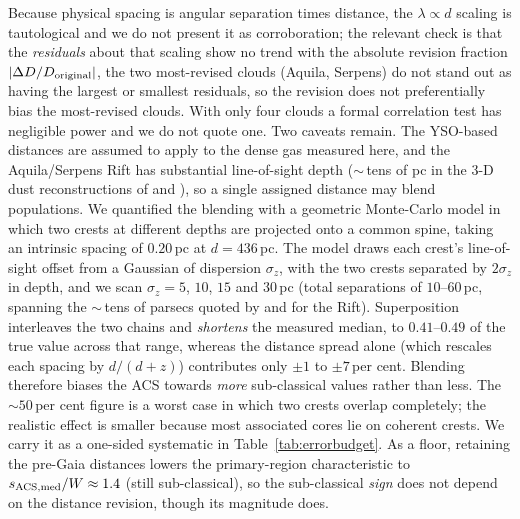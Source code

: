 \documentclass[usenatbib,twoside,twocolumn]{mnras}
\begin{document}
Because physical spacing is angular separation times distance, the $\lambda\propto d$ scaling is tautological and we do not present it as corroboration; the relevant check is that the \emph{residuals} about that scaling show no trend with the absolute revision fraction $|\Delta D/D_{\rm original}|$, the two most-revised clouds (Aquila, Serpens) do not stand out as having the largest or smallest residuals, so the revision does not preferentially bias the most-revised clouds. With only four clouds a formal correlation test has negligible power and we do not quote one. Two caveats remain. The YSO-based distances \citep{Zhang2023} are assumed to apply to the dense gas measured here, and the Aquila/Serpens Rift has substantial line-of-sight depth ($\sim$\,tens of pc in the 3-D dust reconstructions of \citealt{Zucker2020} and \citealt{Green2024}), so a single assigned distance may blend populations. We quantified the blending with a geometric Monte-Carlo model in which two crests at different depths are projected onto a common spine, taking an intrinsic spacing of $0.20$\,pc at $d=436$\,pc. The model draws each crest's line-of-sight offset from a Gaussian of dispersion $\sigma_z$, with the two crests separated by $2\sigma_z$ in depth, and we scan $\sigma_z=5$, $10$, $15$ and $30$\,pc (total separations of $10$--$60$\,pc, spanning the $\sim$\,tens of parsecs quoted by \citealt{Zucker2020} and \citealt{Green2024} for the Rift). Superposition interleaves the two chains and \emph{shortens} the measured median, to $0.41$--$0.49$ of the true value across that range, whereas the distance spread alone (which rescales each spacing by $d/(d+z)$) contributes only $\pm1$ to $\pm7$\,per cent. Blending therefore biases the ACS towards \emph{more} sub-classical values rather than less. The $\sim50$\,per cent figure is a worst case in which two crests overlap completely; the realistic effect is smaller because most associated cores lie on coherent crests. We carry it as a one-sided systematic in Table~\ref{tab:errorbudget}. As a floor, retaining the pre-Gaia distances lowers the primary-region characteristic to $s_{\rm ACS,med}/W\approx1.4$ (still sub-classical), so the sub-classical \emph{sign} does not depend on the distance revision, though its magnitude does.
\end{document}
